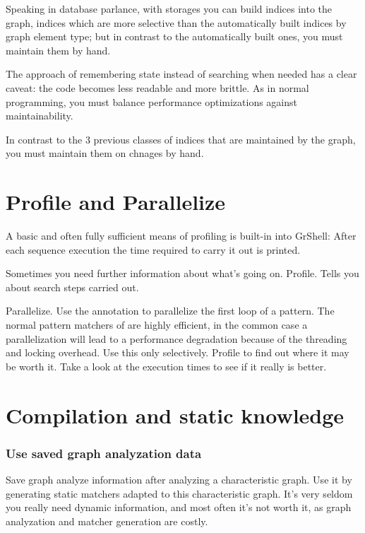 Speaking in database parlance, with storages you can build indices into the graph, indices which are more selective than the automatically built indices by graph element type; but in contrast to the automatically built ones, you must maintain them by hand.

The approach of remembering state instead of searching when needed has a clear caveat: the code becomes less readable and more brittle. As in normal programming, you must balance performance optimizations against maintainability.

In contrast to the 3 previous classes of indices that are maintained by the \GrG{} graph, you must maintain them on chnages by hand.


\section{Profile and Parallelize}

A basic and often fully sufficient means of profiling is built-in into GrShell:
After each sequence execution the time required to carry it out is printed.

Sometimes you need further information about what's going on.
Profile. 
Tells you about search steps carried out.

Parallelize.
Use the annotation to parallelize the first loop of a pattern.
The normal pattern matchers of \GrG{ } are highly efficient, in the common case a parallelization will lead to a performance degradation because of the threading and locking overhead.
Use this only selectively. Profile to find out where it may be worth it. Take a look at the execution times to see if it really is better.

\section{Compilation and static knowledge}

\subsubsection*{Use saved graph analyzation data}
Save graph analyze information after analyzing a characteristic graph.
Use it by generating static matchers adapted to this characteristic graph.
It's very seldom you really need dynamic information, and most often it's not worth it, as graph analyzation and matcher generation are costly.

